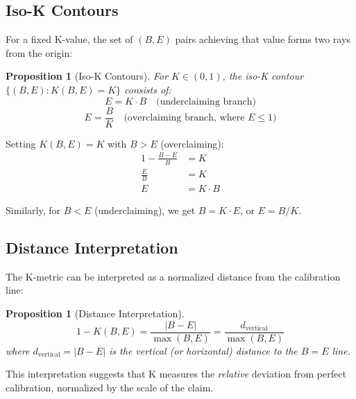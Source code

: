 \documentclass[11pt,a4paper]{article}
\newtheorem{proposition}[theorem]{Proposition}
\theoremstyle{remark}
\begin{document}
\subsection{Iso-K Contours}

For a fixed K-value, the set of $(B, E)$ pairs achieving that value forms two rays from the origin:

\begin{proposition}[Iso-K Contours]
\label{prop:iso-k}
For $K \in (0, 1)$, the iso-K contour $\{(B, E) : K(B, E) = K\}$ consists of:
\begin{equation}
E = K \cdot B \quad \text{(underclaiming branch)}
\end{equation}
\begin{equation}
E = \frac{B}{K} \quad \text{(overclaiming branch, where } E \leq 1\text{)}
\end{equation}
\end{proposition}

\begin{proofbox}
Setting $K(B, E) = K$ with $B > E$ (overclaiming):
\begin{align}
1 - \frac{B - E}{B} &= K \\
\frac{E}{B} &= K \\
E &= K \cdot B
\end{align}

Similarly, for $B < E$ (underclaiming), we get $B = K \cdot E$, or $E = B/K$.
\end{proofbox}

\subsection{Distance Interpretation}

The K-metric can be interpreted as a normalized distance from the calibration line:

\begin{proposition}[Distance Interpretation]
\label{prop:distance}
\begin{equation}
1 - K(B, E) = \frac{|B - E|}{\max(B, E)} = \frac{d_{\text{vertical}}}{\max(B, E)}
\end{equation}
where $d_{\text{vertical}} = |B - E|$ is the vertical (or horizontal) distance to the $B = E$ line.
\end{proposition}

This interpretation suggests that K measures the \textit{relative} deviation from perfect calibration, normalized by the scale of the claim.
\end{document}
